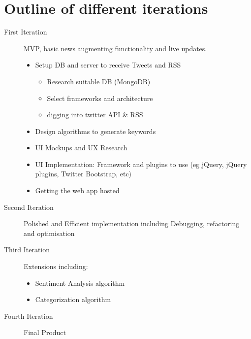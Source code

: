 \documentclass[a4paper,11pt]{article}
\begin{document}
	\section{Outline of different iterations}
	\begin{description}
	  \item[First Iteration] 
	  MVP, basic news augmenting functionality and live updates.
	    \begin{itemize}
	      
	      \item Setup DB and server to receive Tweets and RSS
	      
	      \begin{itemize}
	        \item Research suitable DB (MongoDB)
	        \item Select frameworks and architecture
	        \item digging into twitter API \& RSS
	      \end{itemize}
	      
	      \item Design algorithms to generate keywords
	      \item UI Mockups and UX Research
	      \item UI Implementation: Framework and plugins to use (eg jQuery, jQuery plugins, Twitter Bootstrap, etc)
	      \item Getting the web app hosted
	    \end{itemize}
	    \item[Second Iteration] 
	    Polished and Efficient implementation including Debugging, refactoring and optimisation
	    \item[Third Iteration] 
	    Extensions including:
	      \begin{itemize}
	        \item Sentiment Analysis algorithm
	        \item Categorization algorithm    
	      \end{itemize}
	      
	    \item[Fourth Iteration] 
	    Final Product
	  
	  
	\end{description}
	
\end{document}
